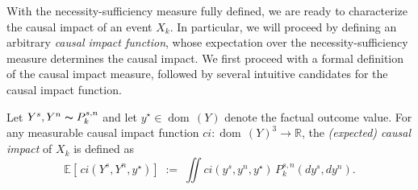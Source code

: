 \documentclass[anon,12pt]{clear2026} %
\newcommand{\dom}{\operatorname{dom}\,}
\begin{document}



With the necessity-sufficiency measure fully defined, we are ready to characterize the causal impact of an event $X_k$. In particular, we will proceed by defining an arbitrary \emph{causal impact function}, whose expectation over the necessity-sufficiency measure determines the causal impact. We first proceed with a formal definition of the causal impact measure, followed by several intuitive candidates for the causal impact function.

\begin{definition}  \label{def:causalimpact}
Let $Y^s, Y^n \thicksim P_k^{s,n}$ and let  \linebreak $y^\star\in\dom(Y)$
denote the factual outcome value.
For any measurable causal impact function\linebreak 
$ci: \dom(Y)^3\to\mathbb{R}$, the
\emph{(expected) causal impact} of $X_k$ is defined as
\begin{equation}\label{eq:causal-impact}
\mathbb{E}\!\left[\,ci\!\left(Y^s,Y^n,y^\star\right)\right]
\;:=\;
\iint
ci(y^s,y^n,y^\star)\,
P_k^{s,n}(d y^s, d y^n).
\end{equation}
\end{definition}
\end{document}
